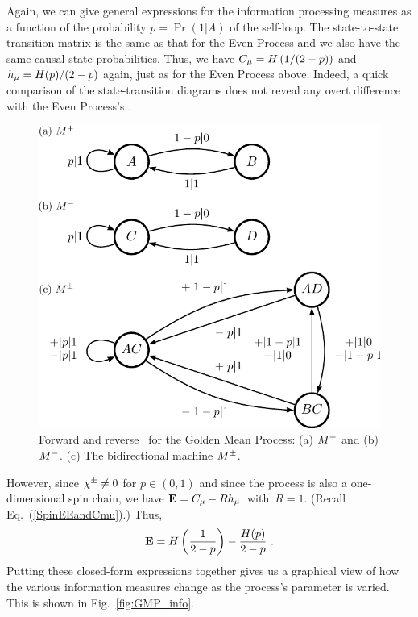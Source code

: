 Again, we can give general expressions for the information processing measures as a function
of the probability $p = \Pr(1|A)$ of the self-loop. The state-to-state
transition matrix is the same as that for the Even Process and we also have
the same causal state probabilities. Thus, we have
$C_\mu = H \left( 1/(2-p) \right)$ and $h_\mu = H(p)/(2-p)$ again, 
just as for the Even Process above. 
Indeed, a quick comparison of the state-transition diagrams does not
reveal any overt difference with the Even Process's \eMs.

\begin{figure}[th]
\centering
\includegraphics[scale=\figscale]{GMP}
\caption{
  Forward and reverse \eMs\ for the Golden Mean Process: (a) ${M}^{+}$ and
  (b) ${M}^{-}$. (c) The bidirectional machine ${M}^{\pm}$.
  }
\label{fig:GMP}
\end{figure}

However, since $\chi^\pm \neq 0$ for $p \in (0,1)$ and since the process is also a
one-dimensional spin chain, we have \mbox{${\bf E} = C_\mu - R h_\mu$ with $R = 1$}.
(Recall Eq.~(\ref{SpinEEandCmu}).) Thus,
\begin{equation}
{\bf E} = H \left( \frac{1}{2-p} \right) - \frac{H(p)}{2-p} ~.
\end{equation}
Putting these closed-form expressions together gives us a
graphical view of how the various information measures change as
the process's parameter is varied. This is shown in Fig.~\ref{fig:GMP_info}.

